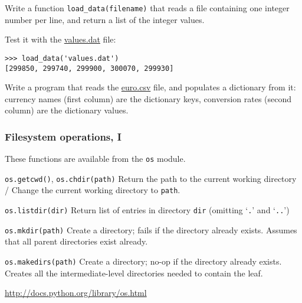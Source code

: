 \documentclass[english,serif,mathserif,xcolor=pdftex,dvipsnames,table]{beamer}
\begin{document}
\begin{frame}[fragile]
  \begin{exercise}
    Write a function \lstinline|load_data(filename)| that reads a file
    containing one integer number per line, and return a list of the
    integer values.

    \+ 
    Test it with the
    \href{http://www.gc3.uzh.ch/teaching/gc3pie2012/python/values.dat}{values.dat}
    file: 
\begin{lstlisting}
>>> load_data('values.dat')
[299850, 299740, 299900, 300070, 299930]
\end{lstlisting}
  \end{exercise}

  \+
  \begin{exercise}
    Write a program that reads the \href{http://www.gc3.uzh.ch/teaching/gc3pie2012/python/euro.csv}{euro.csv} file, and populates a dictionary from it: currency names (first column) are the dictionary keys, conversion rates (second column) are the dictionary values.
  \end{exercise}
\end{frame}


\begin{frame}[fragile]
  \frametitle{Filesystem operations, I}
  \small
  These functions are available from the \texttt{os} module.

  \begin{describe}{\lstinline|os.getcwd()|, \lstinline|os.chdir(path)|}
    Return the path to the current working directory / 
    Change the current working directory to \texttt{path}.
  \end{describe}
    
  \begin{describe}{\lstinline|os.listdir(dir)|}
    Return list of entries in directory \texttt{dir} (omitting
    `\texttt{.}' and `\texttt{..}')
  \end{describe}
  
  \begin{describe}{\lstinline|os.mkdir(path)|}
    Create a directory; fails if the directory already exists.
    Assumes that all parent directories exist already.
  \end{describe}
  
  \begin{describe}{\lstinline|os.makedirs(path)|}
    Create a directory; no-op if the directory already exists.
    Creates all the intermediate-level directories needed to contain
    the leaf.
  \end{describe}
  
  \begin{references}
    \url{http://docs.python.org/library/os.html}
  \end{references}
\end{frame}
\end{document}
